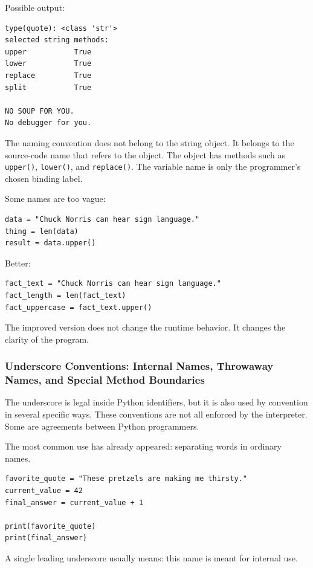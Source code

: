 Possible output:

\begin{verbatim}
type(quote): <class 'str'>
selected string methods:
upper           True
lower           True
replace         True
split           True

NO SOUP FOR YOU.
No debugger for you.
\end{verbatim}

The naming convention does not belong to the string object. It belongs to the source-code name that refers to the object. The object has methods such as \texttt{upper()}, \texttt{lower()}, and \texttt{replace()}. The variable name is only the programmer's chosen binding label.

Some names are too vague:

\begin{verbatim}
data = "Chuck Norris can hear sign language."
thing = len(data)
result = data.upper()
\end{verbatim}

Better:

\begin{verbatim}
fact_text = "Chuck Norris can hear sign language."
fact_length = len(fact_text)
fact_uppercase = fact_text.upper()
\end{verbatim}

The improved version does not change the runtime behavior. It changes the clarity of the program.

\subsubsection{Underscore Conventions: Internal Names, Throwaway Names, and Special Method Boundaries}

The underscore is legal inside Python identifiers, but it is also used by convention in several specific ways. These conventions are not all enforced by the interpreter. Some are agreements between Python programmers.

The most common use has already appeared: separating words in ordinary names.

\begin{verbatim}
favorite_quote = "These pretzels are making me thirsty."
current_value = 42
final_answer = current_value + 1

print(favorite_quote)
print(final_answer)
\end{verbatim}

A single leading underscore usually means: this name is meant for internal use.

